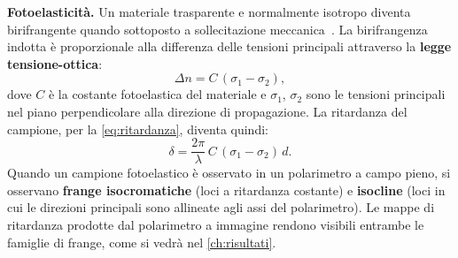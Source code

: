 \textbf{Fotoelasticità.} Un materiale trasparente e normalmente isotropo diventa birifrangente quando sottoposto a sollecitazione meccanica~\cite{goldstein2011polarized}. La birifrangenza indotta è proporzionale alla differenza delle tensioni principali attraverso la \textbf{legge tensione-ottica}:
\begin{equation}
\label{eq:fotoelastica}
\Delta n = C\,(\sigma_1 - \sigma_2),
\end{equation}
dove $C$ è la costante fotoelastica del materiale e $\sigma_1$, $\sigma_2$ sono le tensioni principali nel piano perpendicolare alla direzione di propagazione. La ritardanza del campione, per la \cref{eq:ritardanza}, diventa quindi:
\begin{equation}
\label{eq:ritardanza_fotoelastica}
\delta = \frac{2\pi}{\lambda}\,C\,(\sigma_1 - \sigma_2)\,d.
\end{equation}
Quando un campione fotoelastico è osservato in un polarimetro a campo pieno, si osservano \textbf{frange isocromatiche} (loci a ritardanza costante) e \textbf{isocline} (loci in cui le direzioni principali sono allineate agli assi del polarimetro). Le mappe di ritardanza prodotte dal polarimetro a immagine rendono visibili entrambe le famiglie di frange, come si vedrà nel \cref{ch:risultati}.
